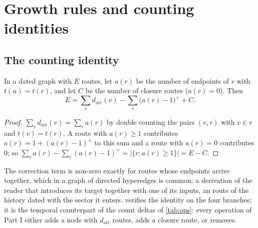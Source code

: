 \chapter{Growth rules and counting identities}\label{ch:growth}

\section{The counting identity}
\begin{theorem}\label{thm:identity}
In a dated graph with $E$ routes, let $a(r)$ be the number of endpoints of $r$ with $t(u)=t(r)$, and let $C$ be the number of closure routes ($a(r)=0$). Then
\[ E=\sum_{v}d_{\mathrm{arr}}(v)-\sum_{r}\bigl(a(r)-1\bigr)^{+}+C . \]
\end{theorem}
\begin{proof}
$\sum_v d_{\mathrm{arr}}(v)=\sum_r a(r)$ by double counting the pairs $(v,r)$ with $v\in r$ and $t(v)=t(r)$. A route with $a(r)\ge1$ contributes $a(r)=1+(a(r)-1)^+$ to this sum and a route with $a(r)=0$ contributes $0$; so $\sum_r a(r)-\sum_r(a(r)-1)^+=|\{r:a(r)\ge1\}|=E-C$.
\end{proof}
The correction term is non-zero exactly for routes whose endpoints arrive together, which in a graph of directed hyperedges is common: a derivation of the reader that introduces its target together with one of its inputs, an  route of the history dated with the sector it enters.  verifies the identity on the four branches; it is the temporal counterpart of the count deltas of \cref{tab:ops}: every operation of Part I either adds a node with $d_{\mathrm{arr}}$ routes, adds a closure route, or removes.
\begin{table}[htbp]\centering\small
\caption{The arrival--closure identity of \cref{thm:identity} on the four dated branches.}\label{tab:evo_identity}

\end{table}

\begin{table}[htbp]\centering\small
\caption{Growth summary of the four dated branches. Frac.: closure fraction $C/E$. $\bar d_{\mathrm{arr}}$: mean degree at arrival. $\alpha$ ($R^2$): densification fit $\log E=\alpha\log V+c$ over the filtration years with $V\ge10$. PA ratio: mean degree of the endpoints of closure routes over the mean degree of all nodes present, evaluated before each closure ($n$ = number of closures).}\label{tab:evo_summary}
\resizebox{\textwidth}{!}{}
\end{table}


